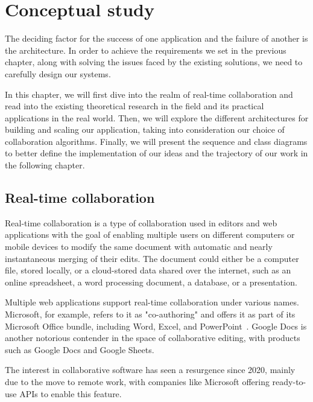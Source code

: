 \chapter{Conceptual study}
\label{chap:conceptual}

\begin{toexclude}
  The deciding factor for the success of one application and the failure of another is the architecture.
  In order to achieve the requirements we set in the previous chapter, along with solving the issues faced by the existing solutions, we need to carefully design our systems.

  In this chapter, we will first dive into the realm of real-time collaboration and read into the existing theoretical research in the field and its practical applications in the real world.
  Then, we will explore the different architectures for building and scaling our application, taking into consideration our choice of collaboration algorithms.
  Finally, we will present the sequence and class diagrams to better define the implementation of our ideas and the trajectory of our work in the following chapter.

  \section{Real-time collaboration}

  Real-time collaboration is a type of collaboration used in editors and web applications with the goal of enabling multiple users on different computers or mobile devices to modify the same document with automatic and nearly instantaneous merging of their edits.
  The document could either be a computer file, stored locally, or a cloud-stored data shared over the internet, such as an online spreadsheet, a word processing document, a database, or a presentation.

  Multiple web applications support real-time collaboration under various names.
  Microsoft, for example, refers to it as "co-authoring" and offers it as part of its Microsoft Office bundle, including Word, Excel, and PowerPoint~\autocite{noauthor_document_nodate}.
  Google Docs is another notorious contender in the space of collaborative editing, with products such as Google Docs and Google Sheets.

  The interest in collaborative software has seen a resurgence since 2020, mainly due to the move to remote work, with companies like Microsoft offering ready-to-use APIs to enable this feature.


\end{toexclude}
